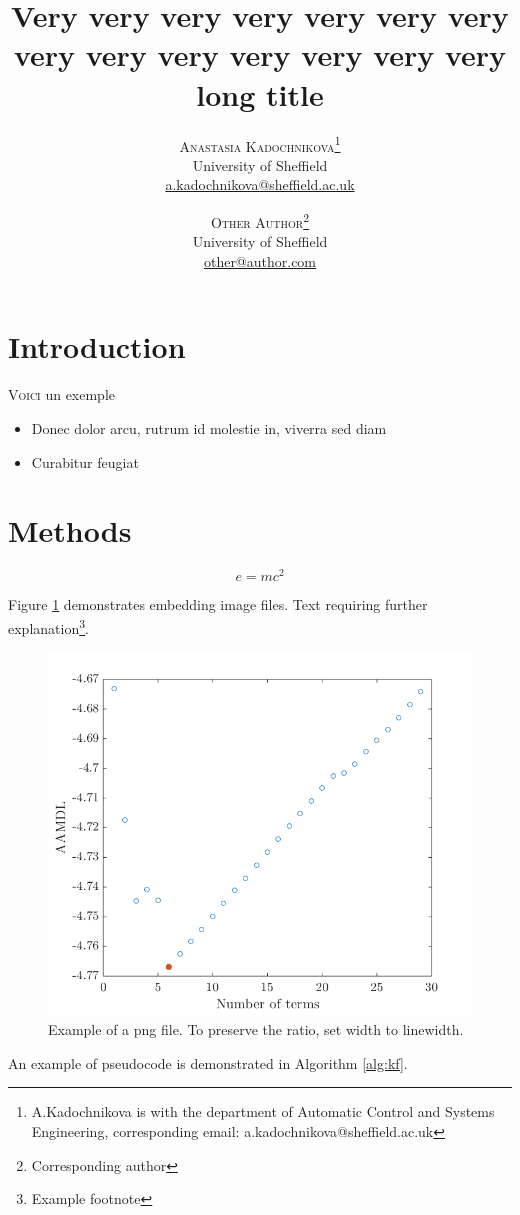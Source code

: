 \documentclass[twoside,twocolumn]{article}
\title{Very very very very very very very very very very very very very very long title} %
\author{%
\textsc{Anastasia Kadochnikova}\thanks{A.Kadochnikova is with the department of Automatic Control and Systems Engineering, corresponding email: a.kadochnikova@sheffield.ac.uk} \\[1ex] %
\normalsize University of Sheffield \\ %
\normalsize \href{mailto:a.kadochnikova@sheffield.ac.uk}{a.kadochnikova@sheffield.ac.uk} %
\and %
\textsc{Other Author}\thanks{Corresponding author} \\[1ex] %
\normalsize University of Sheffield \\ %
\normalsize \href{mailto:other@author.com}{other@author.com} %
}
\date{}
\theoremstyle{mytheoremstyle}
\begin{document}
\maketitle


\section{Introduction}

\lettrine[lraise=0.1, nindent=0em, slope=-.5em]{V}{oici} un exemple
\blindtext %
\par \blindtext %
\begin{itemize}
	\item Donec dolor arcu, rutrum id molestie in, viverra sed diam
	\item Curabitur feugiat
\end{itemize}


\section{Methods}
\par \blindtext %
\begin{equation}\label{eq:emc}
e = mc^2
\end{equation}
\par \blindtext %
\par Figure \ref{fig:example} demonstrates embedding image files.
Text requiring further explanation\footnote{Example footnote}.
\begin{figure}[!t]
	\includegraphics[width=\linewidth]{Figures/example_figure.png}
	\caption{Example of a png file. To preserve the ratio, set width to linewidth.}\label{fig:example}
\end{figure}
\par An example of pseudocode is demonstrated in Algorithm \ref{alg:kf}.
\end{document}
